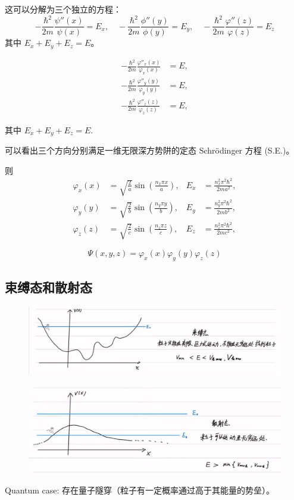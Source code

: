 \documentclass[lang=cn,10pt]{elegantbook}
\begin{document}
这可以分解为三个独立的方程：
\[
-\frac{\hbar^2}{2m} \frac{\psi''(x)}{\psi(x)} = E_x, \quad -\frac{\hbar^2}{2m} \frac{\phi''(y)}{\phi(y)} = E_y, \quad -\frac{\hbar^2}{2m} \frac{\varphi''(z)}{\varphi(z)} = E_z
\]
其中 $E_x + E_y + E_z = E$。


\begin{align*}
	-\frac{\hbar^2}{2m} \frac{\varphi''_x(x)}{\varphi_x(x)} &= E, \\
	-\frac{\hbar^2}{2m} \frac{\varphi''_y(y)}{\varphi_y(y)} &= E, \\
	-\frac{\hbar^2}{2m} \frac{\varphi''_z(z)}{\varphi_z(z)} &= E,
\end{align*}

其中 $E_x + E_y + E_z = E$.

可以看出三个方向分别满足一维无限深方势阱的定态 Schrödinger 方程 (S.E.)。

则
\begin{align*}
	\varphi_x(x) &= \sqrt{\frac{2}{a}} \sin\left(\frac{n_x \pi x}{a}\right), & E_x &= \frac{n_x^2 \pi^2 \hbar^2}{2ma^2}, \\
	\varphi_y(y) &= \sqrt{\frac{2}{b}} \sin\left(\frac{n_y \pi y}{b}\right), & E_y &= \frac{n_y^2 \pi^2 \hbar^2}{2mb^2}, \\
	\varphi_z(z) &= \sqrt{\frac{2}{c}} \sin\left(\frac{n_z \pi z}{c}\right), & E_z &= \frac{n_z^2 \pi^2 \hbar^2}{2mc^2},
\end{align*}

\[
\Psi(x, y, z) = \varphi_x(x) \varphi_y(y) \varphi_z(z)
\]
\subsection{束缚态和散射态}

\begin{figure}[H]
	\centering
	\includegraphics[width=0.7\linewidth]{figure/screenshot0021}
\end{figure}

\begin{figure}[H]
	\centering
	\includegraphics[width=0.7\linewidth]{figure/screenshot0022}
\end{figure}
Quantum case: 存在量子隧穿（粒子有一定概率通过高于其能量的势垒）。
\end{document}
